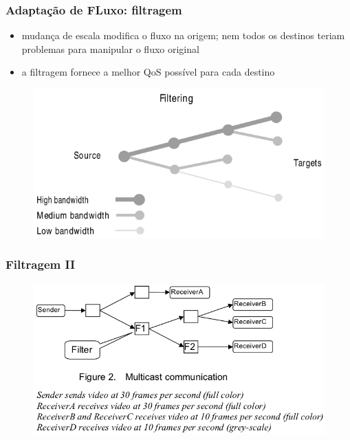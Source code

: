\documentclass[]{beamer}
\begin{document}
\begin{frame}
 \frametitle{Adaptação de FLuxo: filtragem}
 \begin{itemize}
   \item mudança de escala modifica o fluxo na origem; nem todos os destinos teriam 
problemas para manipular o fluxo original
   \item a filtragem fornece a melhor QoS possível para cada destino
  \end{itemize}

  \begin{figure}[hbtp]
   \begin{center}
    \includegraphics[scale=0.26]{filtering.png}
   \end{center}
  \end{figure}

\end{frame}

\begin{frame}
  \frametitle{Filtragem II \cite{Mingyang:2002}}
  \begin{figure}[hbtp]
  \begin{center}
   \includegraphics[scale=0.44]{filter_multicast.png}
  \end{center}
 \end{figure}
\end{frame}
\end{document}
